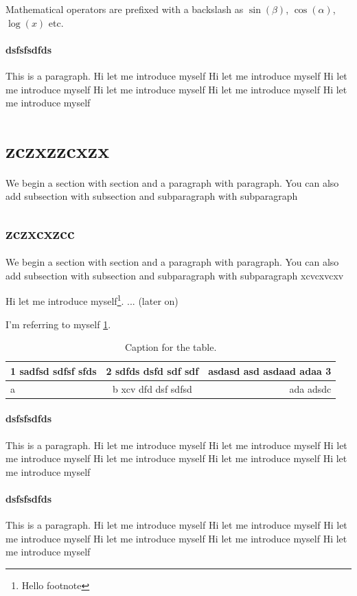 \documentclass{article}
\begin{document}
Mathematical operators are prefixed with a backslash as $\sin(\beta)$, $\cos(\alpha)$, $\log(x)$ etc.

\paragraph{dsfsfsdfds}
This is a paragraph. Hi let me introduce myself Hi let me introduce myself Hi let me introduce myself Hi let me introduce myself Hi let me introduce myself Hi let me introduce myself


\section{zczxzzcxzx}
We begin a section with section and a paragraph with paragraph. You can also add subsection with subsection and subparagraph with subparagraph

\subsection{zczxcxzcc}
We begin a section with section and a paragraph with paragraph. You can also add subsection with subsection and subparagraph with subparagraph
xcvcxvcxv

Hi let me introduce myself\footnote{\label{myfootnote}Hello footnote}.
... (later on)

I'm referring to myself \ref{myfootnote}.

\begin{table}[h!]
  \centering
  \caption{Caption for the table.}
  \label{tab:table1}

  \begin{tabular}{|l|c|||r|}
    \hline
    1 sadfsd sdfsf sfds & 2 sdfds dsfd sdf sdf & asdasd asd asdaad adaa 3\\
    \hline
    a & b xcv dfd dsf sdfsd & ada adsdc\\
    \hline
  \end{tabular}

\end{table}


\paragraph{dsfsfsdfds}
This is a paragraph. Hi let me introduce myself Hi let me introduce myself Hi let me introduce myself Hi let me introduce myself Hi let me introduce myself Hi let me introduce myself

\paragraph{dsfsfsdfds}
This is a paragraph. Hi let me introduce myself Hi let me introduce myself Hi let me introduce myself Hi let me introduce myself Hi let me introduce myself Hi let me introduce myself
\end{document}
